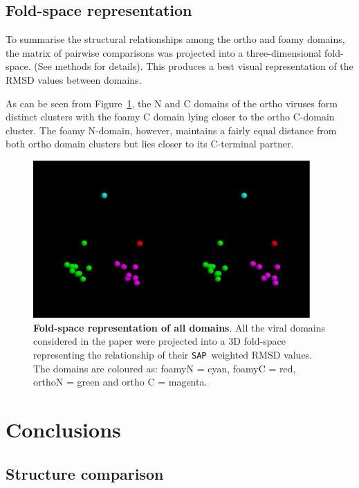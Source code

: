 \documentclass[preprint,12pt]{elsarticle}
\newcommand{\SAP}{{\tt SAP}}
\newcommand{\Fig}[1]{Figure~\ref{Fig:#1}}
\begin{document}
\subsection{Fold-space representation}

To summarise the structural relationships among the ortho and foamy domains, the matrix
of pairwise comparisons was projected into a three-dimensional fold-space.  (See methods
for details).   This produces a best visual representation of the RMSD values between domains.

As can be seen from \Fig{space}, the N and C domains of the ortho viruses form distinct
clusters with the foamy C domain lying closer to the ortho C-domain cluster.   The foamy
N-domain, however, maintains a fairly equal distance from both ortho domain clusters but
lies closer to its C-terminal partner.

\begin{figure}
\centering
\includegraphics[width=300pt]{foldspace-space.eps}
\begin{footnotesize}
\caption{
\label{Fig:space}
{\bf Fold-space representation of all domains}.
All the viral domains considered in the paper were projected into a 3D fold-space representing
the relationship of their \SAP\ weighted RMSD values.   The domains are coloured as:
foamyN = cyan, foamyC = red, orthoN = green and ortho C = magenta.
}
\end{footnotesize}
\end{figure}

\section{Conclusions}

\subsection{Structure comparison}
\end{document}
